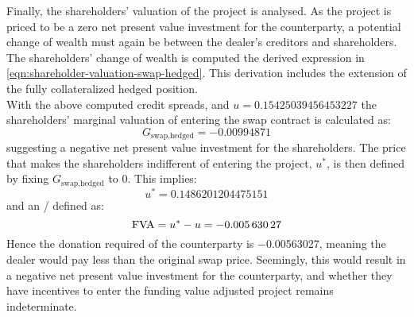 \documentclass[main.tex]{subfiles}
\begin{document}
        Finally, the shareholders' valuation of the project is analysed.
        As the project is priced to be a zero net present value investment for the counterparty,
        a potential change of wealth must again be between the dealer's creditors and shareholders.
        The shareholders' change of wealth is computed the derived expression in \cref{eqn:shareholder-valuation-swap-hedged}.
        This derivation includes the extension of the fully collateralized hedged position.
        \\
        With the above computed credit spreads, and $u=\num{0.15425039456453227}$
        the shareholders' marginal valuation of entering the swap contract is calculated as:
        \begin{equation}
            G_{\text{swap,hedged}} = \num{-0.00994871}
        \end{equation}
        suggesting a negative net present value investment for the shareholders. 
        The price that makes the shareholders indifferent of entering the project, $u^{\ast}$, is then defined by fixing $G_{\text{swap,hedged}}$ to 0.
        This implies:
        \begin{equation}
            u^{\ast} = \num{0.1486201204475151}
        \end{equation}
        and an \FVA/ defined as:
        \begin{equation}
            \FVA/ = u^{\ast} - u = \num{-0.00563027}
        \end{equation}
        Hence the donation required of the counterparty is \num{-0.00563027},
        meaning the dealer would pay less than the original swap price.
        Seemingly, this would result in a negative net present value investment for the counterparty,
        and whether they have incentives to enter the funding value adjusted project remains indeterminate.
\end{document}
